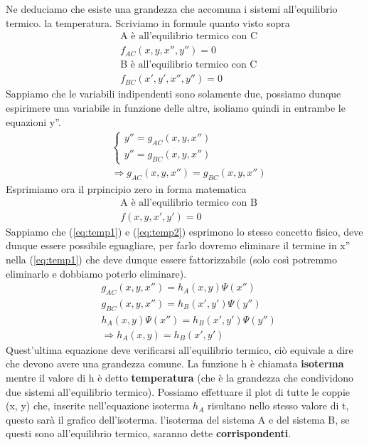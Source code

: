 \documentclass[10pt,a4paper]{article}
\begin{document}
Ne deduciamo che esiste una grandezza che accomuna i sistemi all'equilibrio termico. la temperatura. Scriviamo in formule quanto visto sopra
\begin{align*}
&\text{A è all'equilibrio termico con C}\\
&f_{AC}(x, y, x'', y'') = 0\\
&\text{B è all'equilibrio termico con C}\\
&f_{BC}(x', y', x'', y'') = 0
\end{align*}
Sappiamo che le variabili indipendenti sono solamente due, possiamo dunque espirimere una variabile in funzione delle altre, isoliamo quindi in entrambe le equazioni y''. 
\begin{align}\label{eq:temp1}
&\begin{cases}
	y'' = g_{AC}(x, y, x'')\\
	y'' = g_{BC}(x, y, x'')
\end{cases}\\\nonumber
&\Rightarrow g_{AC}(x, y, x'')=  g_{BC}(x, y, x'')
\end{align}
Esprimiamo ora il prpincipio zero in forma matematica
\begin{align}\label{eq:temp2}
&\text{A è all'equilibrio termico con B}\\ \nonumber
&f(x,y, x', y') = 0
\end{align}
Sappiamo che (\ref{eq:temp1}) e (\ref{eq:temp2}) esprimono lo stesso concetto fisico, deve dunque essere possibile eguagliare, per farlo dovremo eliminare il termine in x'' nella (\ref{eq:temp1}) che deve dunque essere fattorizzabile (solo così potremmo eliminarlo e dobbiamo poterlo eliminare).
\begin{align*}
	&g_{AC}(x, y, x'')=h_A(x, y) \Psi(x'') \\
	&g_{BC}(x, y, x'')=h_B(x', y') \Psi(y'')\\
	&h_A(x, y) \Psi(x'')=h_B(x', y') \Psi(y'')\\
	&\Rightarrow h_A(x, y) = h_B(x', y')
\end{align*}
Quest'ultima equazione deve verificarsi all'equilibrio termico, ciò equivale a dire che devono avere una grandezza comune. La funzione h è chiamata \textbf{isoterma} mentre il valore di h è detto \textbf{temperatura} (che è la grandezza che condividono due sistemi all'equilibrio termico). Possiamo effettuare il plot di tutte le coppie (x, y) che, inserite nell'equazione isoterma $h_A$ risultano nello stesso valore di t, questo sarà il grafico dell'isoterma. l'isoterma del sistema A e del sistema B, se questi sono all'equilibrio termico, saranno dette \textbf{corrispondenti}. 
\end{document}
